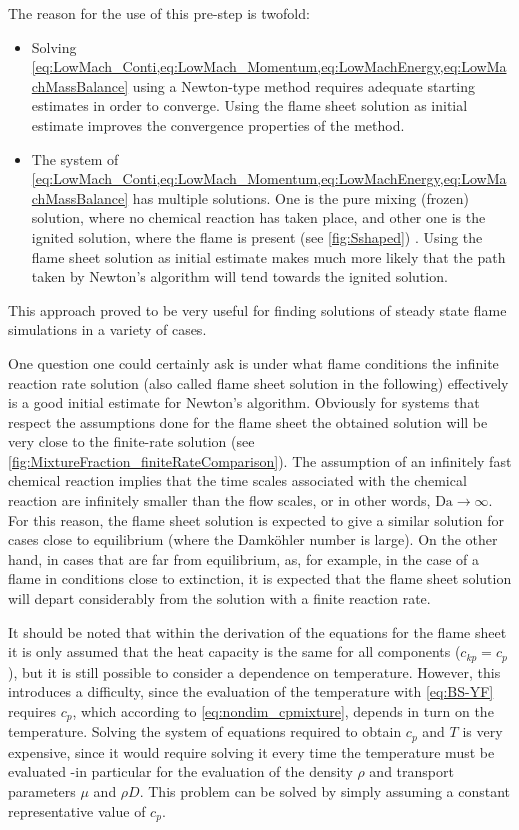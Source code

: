  The reason for the use of this pre-step is twofold:
\begin{itemize}
	\item Solving \cref*{eq:LowMach_Conti,eq:LowMach_Momentum,eq:LowMachEnergy,eq:LowMachMassBalance} using a Newton-type method requires adequate starting estimates in order to converge. Using the flame sheet solution as initial estimate improves the convergence properties of the method.
	\item The system of  \cref*{eq:LowMach_Conti,eq:LowMach_Momentum,eq:LowMachEnergy,eq:LowMachMassBalance} has multiple solutions. One is the pure mixing (frozen) solution, where no chemical reaction has taken place, and other one is the ignited solution, where the flame is present (see \cref{fig:Sshaped}) . Using the flame sheet solution as initial estimate makes much more likely that the path taken by Newton's algorithm will tend towards the ignited solution.
\end{itemize}
This approach proved to be very useful for finding solutions of steady state flame simulations in a variety of cases. 

One question one could certainly ask is under what flame conditions the infinite reaction rate solution (also called flame sheet solution in the following) effectively is a good initial estimate for Newton's algorithm.  Obviously for systems that respect the assumptions done for the flame sheet the obtained solution will be very close to the finite-rate solution (see \cref{fig:MixtureFraction_finiteRateComparison}). The assumption of an infinitely fast chemical reaction implies that the time scales associated with the chemical reaction are infinitely smaller than the flow scales, or in other words, $\text{Da} \to \infty$. For this reason, the flame sheet solution is expected to give a similar solution for cases close to equilibrium (where the Damköhler number is large). On the other hand, in cases that are far from equilibrium, as, for example, in the case of a flame in conditions close to extinction, it is expected that the flame sheet solution will depart considerably from the solution with a finite reaction rate.

It should be noted that within the derivation of the equations for the flame sheet it is only assumed that the heat capacity is the same for all components ($c_{kp} = c_p$), but it is still possible to consider a dependence on temperature. However, this introduces a difficulty, since the evaluation of the temperature with \cref{eq:BS-YF} requires $c_p$, which according to \cref{eq:nondim_cpmixture}, depends in turn on the temperature. Solving the system of equations required to obtain $c_p$ and $T$ is very expensive, since it would require solving it every time the temperature must be evaluated -in particular for the evaluation of the density $\rho$ and transport parameters $\mu$ and $\rho D$.  This problem can be solved by simply assuming a constant representative value of $c_p$. 

